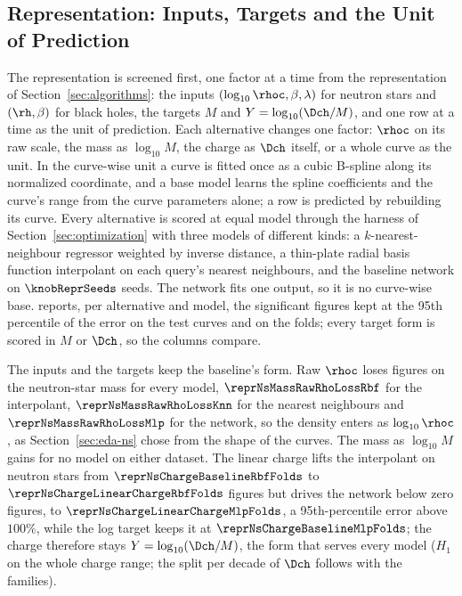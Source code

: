 \subsection{Representation: Inputs, Targets and the Unit of Prediction}
\label{sec:representation}

The representation is screened first, one factor at a time from the representation of Section~\ref{sec:algorithms}: the inputs $(\log_{10}\rhoc, \beta, \lambda)$ for neutron stars and $(\rh, \beta)$ for black holes, the targets $M$ and $Y = \log_{10}(\Dch/M)$, and one row at a time as the unit of prediction. Each alternative changes one factor: $\rhoc$ on its raw scale, the mass as $\log_{10} M$, the charge as $\Dch$ itself, or a whole curve as the unit. In the curve-wise unit a curve is fitted once as a cubic B-spline along its normalized coordinate, and a base model learns the spline coefficients and the curve's range from the curve parameters alone; a row is predicted by rebuilding its curve. Every alternative is scored at equal model through the harness of Section~\ref{sec:optimization} with three models of different kinds: a $k$-nearest-neighbour regressor weighted by inverse distance, a thin-plate radial basis function interpolant on each query's nearest neighbours, and the baseline network on $\knobReprSeeds$ seeds. The network fits one output, so it is no curve-wise base.  reports, per alternative and model, the significant figures kept at the 95th percentile of the error on the test curves and on the folds; every target form is scored in $M$ or $\Dch$, so the columns compare.


The inputs and the targets keep the baseline's form. Raw $\rhoc$ loses figures on the neutron-star mass for every model, $\reprNsMassRawRhoLossRbf$ for the interpolant, $\reprNsMassRawRhoLossKnn$ for the nearest neighbours and $\reprNsMassRawRhoLossMlp$ for the network, so the density enters as $\log_{10}\rhoc$, as Section~\ref{sec:eda-ns} chose from the shape of the curves. The mass as $\log_{10} M$ gains for no model on either dataset. The linear charge lifts the interpolant on neutron stars from $\reprNsChargeBaselineRbfFolds$ to $\reprNsChargeLinearChargeRbfFolds$ figures but drives the network below zero figures, to $\reprNsChargeLinearChargeMlpFolds$, a 95th-percentile error above $100\%$, while the log target keeps it at $\reprNsChargeBaselineMlpFolds$; the charge therefore stays $Y = \log_{10}(\Dch/M)$, the form that serves every model ($H_1$ on the whole charge range; the split per decade of $\Dch$ follows with the families).

